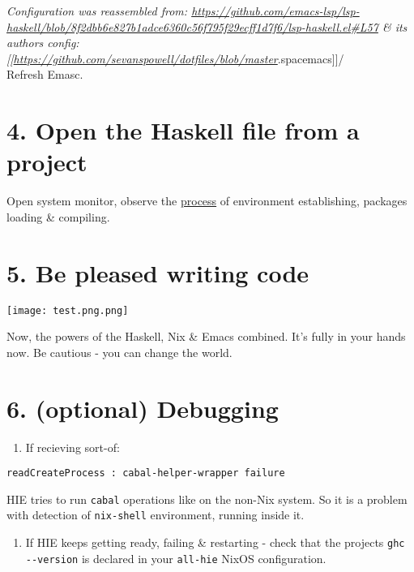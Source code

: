 \documentclass[a4paper,14pt,oneside]{book}
\begin{document}
\emph{Configuration was reassembled from: \url{https://github.com/emacs-lsp/lsp-haskell/blob/8f2dbb6e827b1adce6360c56f795f29ecff1d7f6/lsp-haskell.el\#L57} \& its authors config: [[\url{https://github.com/sevanspowell/dotfiles/blob/master}}.spacemacs]]/\\

Refresh Emasc.\\

\section{4. Open the Haskell file from a project}
\label{sec:orge6ad647}

Open system monitor, observe the \hyperref[org22eaf2d]{process} of environment establishing, packages loading \& compiling.\\

\section{5. Be pleased writing code}
\label{sec:org54c1f76}

\begin{center}
\texttt{[image: test.png.png]}
\end{center}

Now, the powers of the Haskell, Nix \& Emacs combined. It's fully in your hands now. Be cautious - you can change the world.\\

\section{6. (optional) Debugging}
\label{sec:org3ea46fc}

\begin{enumerate}
\item If recieving sort-of:\\
\end{enumerate}

\begin{verbatim}
readCreateProcess : cabal-helper-wrapper failure
\end{verbatim}

HIE tries to run \texttt{cabal} operations like on the non-Nix system. So it is a problem with detection of \texttt{nix-shell} environment, running inside it.\\

\begin{enumerate}
\item If HIE keeps getting ready, failing \& restarting - check that the projects \texttt{ghc -{}-version} is declared in your \texttt{all-hie} NixOS configuration.\\
\end{enumerate}
\end{document}
